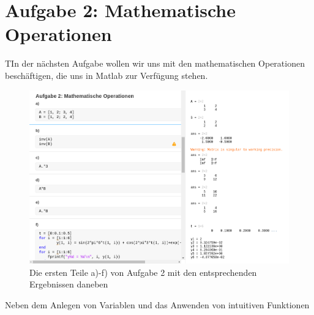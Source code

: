 \documentclass{article}
\begin{document}
\section{Aufgabe 2: Mathematische Operationen}

\begin{task}
  TIn der nächsten Aufgabe wollen wir uns mit den mathematischen Operationen beschäftigen, die uns in Matlab zur Verfügung stehen.
\end{task}

\begin{figure}[h]
  \centering
  \includegraphics[width=\textwidth]{../assets/images/ET2P6/aufgaben2a_f.png}
  \caption{Die ersten Teile a)-f) von Aufgabe 2 mit den entsprechenden Ergebnissen daneben}
  \label{fig:auf2af}
\end{figure}

Neben dem Anlegen von Variablen und das Anwenden von intuitiven Funktionen
\end{document}
